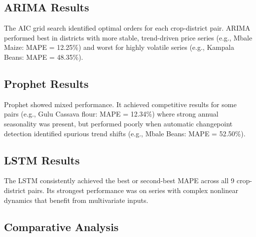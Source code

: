\documentclass[12pt,a4paper]{article}
\begin{document}
\subsection{ARIMA Results}
The AIC grid search identified optimal orders for each crop-district pair. ARIMA performed best in districts with more stable, trend-driven price series (e.g., Mbale Maize: MAPE = 12.25\%) and worst for highly volatile series (e.g., Kampala Beans: MAPE = 48.35\%).

\subsection{Prophet Results}
Prophet showed mixed performance. It achieved competitive results for some pairs (e.g., Gulu Cassava flour: MAPE = 12.34\%) where strong annual seasonality was present, but performed poorly when automatic changepoint detection identified spurious trend shifts (e.g., Mbale Beans: MAPE = 52.50\%).

\subsection{LSTM Results}
The LSTM consistently achieved the best or second-best MAPE across all 9 crop-district pairs. Its strongest performance was on series with complex nonlinear dynamics that benefit from multivariate inputs.

\subsection{Comparative Analysis}
\end{document}
